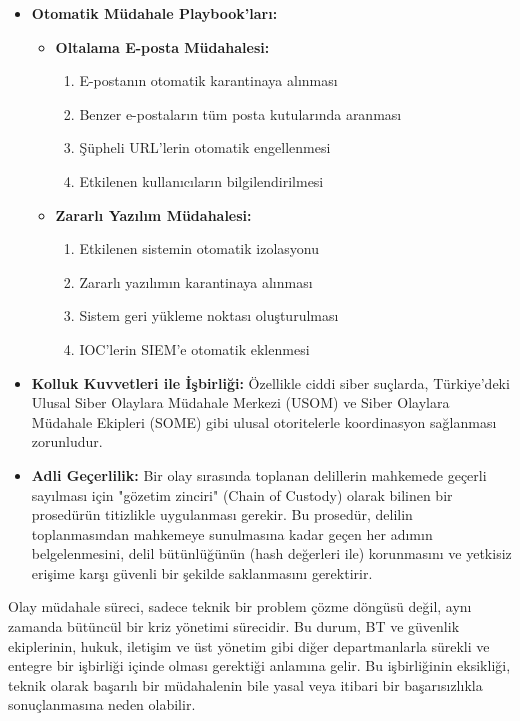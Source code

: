 \begin{itemize}
\begin{itemize}
\begin{itemize}
    \item \textbf{Otomatik Müdahale Playbook'ları:}
    \begin{itemize}
        \item \textbf{Oltalama E-posta Müdahalesi:}
        \begin{enumerate}
            \item E-postanın otomatik karantinaya alınması
            \item Benzer e-postaların tüm posta kutularında aranması
            \item Şüpheli URL'lerin otomatik engellenmesi
            \item Etkilenen kullanıcıların bilgilendirilmesi
        \end{enumerate}
        \item \textbf{Zararlı Yazılım Müdahalesi:}
        \begin{enumerate}
            \item Etkilenen sistemin otomatik izolasyonu
            \item Zararlı yazılımın karantinaya alınması
            \item Sistem geri yükleme noktası oluşturulması
            \item IOC'lerin SIEM'e otomatik eklenmesi
        \end{enumerate}
    \end{itemize}
\end{itemize}

\begin{itemize}
    \item \textbf{Kolluk Kuvvetleri ile İşbirliği:} Özellikle ciddi siber suçlarda, Türkiye'deki Ulusal Siber Olaylara Müdahale Merkezi (USOM) ve Siber Olaylara Müdahale Ekipleri (SOME) gibi ulusal otoritelerle koordinasyon sağlanması zorunludur.

    \item \textbf{Adli Geçerlilik:} Bir olay sırasında toplanan delillerin mahkemede geçerli sayılması için "gözetim zinciri" (Chain of Custody) olarak bilinen bir prosedürün titizlikle uygulanması gerekir. Bu prosedür, delilin toplanmasından mahkemeye sunulmasına kadar geçen her adımın belgelenmesini, delil bütünlüğünün (hash değerleri ile) korunmasını ve yetkisiz erişime karşı güvenli bir şekilde saklanmasını gerektirir.
\end{itemize}

Olay müdahale süreci, sadece teknik bir problem çözme döngüsü değil, aynı zamanda bütüncül bir kriz yönetimi sürecidir. Bu durum, BT ve güvenlik ekiplerinin, hukuk, iletişim ve üst yönetim gibi diğer departmanlarla sürekli ve entegre bir işbirliği içinde olması gerektiği anlamına gelir. Bu işbirliğinin eksikliği, teknik olarak başarılı bir müdahalenin bile yasal veya itibari bir başarısızlıkla sonuçlanmasına neden olabilir.


\end{itemize}
\end{itemize}
